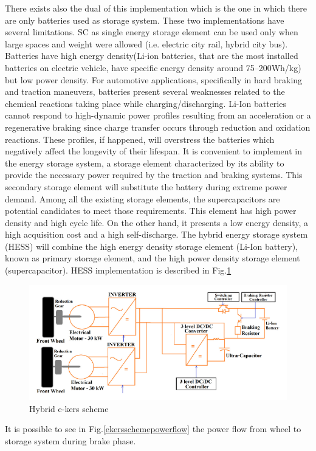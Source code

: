 \documentclass[11pt]{article}
\begin{document}
There exists also the dual of this implementation which is the one in which there are only batteries used as storage system. These two implementations have several limitations. SC as single energy storage element can be used only when large spaces and weight were allowed (i.e. electric city rail, hybrid city bus). Batteries have high energy density(Li-ion batteries, that are the most installed batteries on electric vehicle, have specific energy density around 75–200Wh/kg) but low power density. For automotive applications, specifically in hard braking and traction maneuvers, batteries present several weaknesses related to the chemical reactions taking place while charging/discharging. Li-Ion batteries cannot respond to high-dynamic power profiles resulting from an acceleration or a regenerative
braking since charge transfer occurs through reduction and oxidation reactions. These profiles, if happened, will overstress the batteries which negatively affect the longevity of their lifespan. It is convenient to implement in the energy storage system, a storage element characterized by its ability to provide the necessary power required by the traction and braking systems. This secondary storage element will substitute the battery during extreme power demand. Among all the existing storage elements, the supercapacitors are potential candidates to meet those requirements. This element has high power density and high cycle life. On the other hand, it presents a low energy density, a high acquisition cost and a high self-discharge. The hybrid energy storage system (HESS) will combine the high energy density storage element (Li-Ion battery), known as primary storage element, and the high power density storage element (supercapacitor). HESS implementation is described in Fig.\ref{ekersschemehybrid}

\begin{figure}[H]
	\centering
	\includegraphics[width=.6\textwidth]{Images/Electric_KERS_scheme_hybrid.PNG}
	\caption{Hybrid e-kers scheme}
	\label{ekersschemehybrid}
\end{figure}

It is possible to see in Fig.\ref{ekersschemepowerflow} the power flow from wheel to storage system during brake phase.
\end{document}
